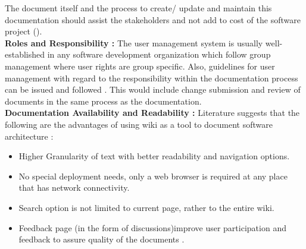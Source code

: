 \indent The document itself and the process to create/ update and maintain this documentation should assist the stakeholders and not add to cost of the software project (\cite{Shahin2014}).
\\\indent \textbf{Roles and Responsibility : }The user management system is usually well-established in any software development organization which follow group management where user rights are group specific. Also, guidelines for user management with regard to the responsibility within the documentation process can be issued and followed \cite{5314237}. This would include change submission and review of documents in the same process as the documentation.
\\\indent \textbf{Documentation Availability and Readability : } Literature suggests that the following are the advantages of using wiki as a tool to document software architecture \cite{Bachmann2005} :
\begin{itemize}
\item Higher Granularity of text with better readability and navigation options.
\item No special deployment needs, only a web browser is required at any place that has network connectivity.
\item Search option is not limited to current page, rather to the entire wiki.
\item Feedback page (in the form of discussions)improve user participation and feedback to assure quality of the documents \cite{Zhao2003}.
\end{itemize}


